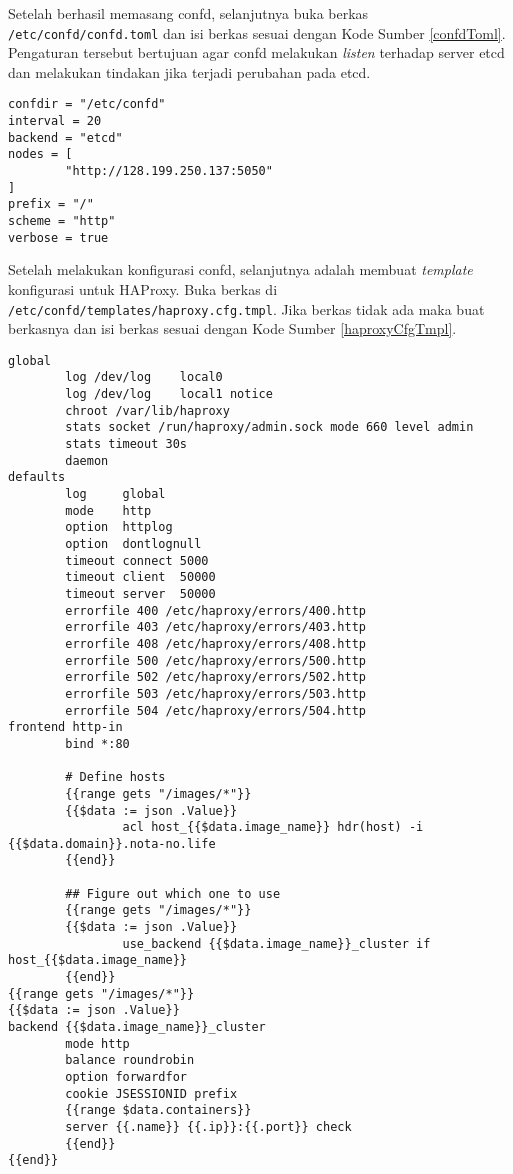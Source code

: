 	Setelah berhasil memasang confd, selanjutnya buka berkas \texttt{/etc/confd/confd.toml} dan isi berkas sesuai dengan Kode Sumber \ref{confdToml}. Pengaturan tersebut bertujuan agar confd melakukan \textit{listen} terhadap server etcd dan melakukan tindakan jika terjadi perubahan pada etcd.
	\begin{lstlisting}[frame=single,tabsize=2,breaklines,caption={Isi Berkas confd.toml},label=confdToml, captionpos=b]
confdir = "/etc/confd"
interval = 20
backend = "etcd"
nodes = [
        "http://128.199.250.137:5050"
]
prefix = "/"
scheme = "http"
verbose = true
		\end{lstlisting}
	Setelah melakukan konfigurasi confd, selanjutnya adalah membuat \textit{template} konfigurasi untuk HAProxy. Buka berkas di \texttt{/etc/confd/templates/haproxy.cfg.tmpl}. Jika berkas tidak ada maka buat berkasnya dan isi berkas sesuai dengan Kode Sumber \ref{haproxyCfgTmpl}.
        
    \begin{lstlisting}[frame=single,tabsize=2,breaklines,caption={Isi Berkas haproxy.cfg.tmpl},label=haproxyCfgTmpl, captionpos=b]
global
        log /dev/log    local0
        log /dev/log    local1 notice
        chroot /var/lib/haproxy
        stats socket /run/haproxy/admin.sock mode 660 level admin
        stats timeout 30s
        daemon
defaults
        log     global
        mode    http
        option  httplog
        option  dontlognull
        timeout connect 5000
        timeout client  50000
        timeout server  50000
        errorfile 400 /etc/haproxy/errors/400.http
        errorfile 403 /etc/haproxy/errors/403.http
        errorfile 408 /etc/haproxy/errors/408.http
        errorfile 500 /etc/haproxy/errors/500.http
        errorfile 502 /etc/haproxy/errors/502.http
        errorfile 503 /etc/haproxy/errors/503.http
        errorfile 504 /etc/haproxy/errors/504.http
frontend http-in
        bind *:80

        # Define hosts
        {{range gets "/images/*"}}
        {{$data := json .Value}}
                acl host_{{$data.image_name}} hdr(host) -i {{$data.domain}}.nota-no.life
        {{end}}

        ## Figure out which one to use
        {{range gets "/images/*"}}
        {{$data := json .Value}}
                use_backend {{$data.image_name}}_cluster if host_{{$data.image_name}}
        {{end}}
{{range gets "/images/*"}}
{{$data := json .Value}}
backend {{$data.image_name}}_cluster
        mode http
        balance roundrobin
        option forwardfor
        cookie JSESSIONID prefix
        {{range $data.containers}}
        server {{.name}} {{.ip}}:{{.port}} check
        {{end}}
{{end}}
		\end{lstlisting}    

